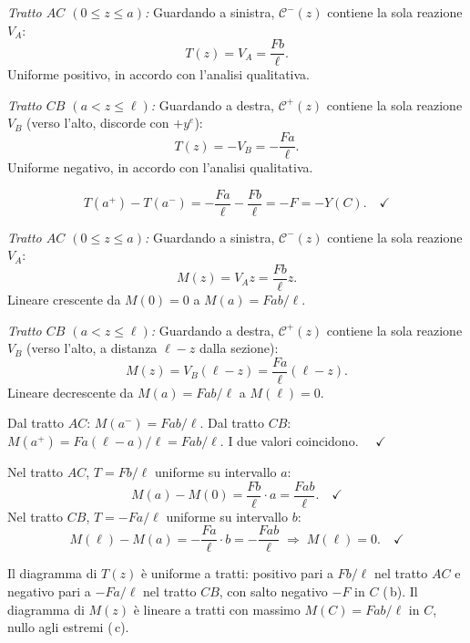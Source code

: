 \begin{esempio}
\begin{svolgimento}
		
		\textit{Tratto $AC$ $(0 \leq z \leq a)$:}
		Guardando a sinistra, $\mathcal{C}^-(z)$
		contiene la sola reazione $V_A$:
		\[
		T(z) = V_A = \frac{Fb}{\ell}.
		\]
		Uniforme positivo, in accordo con l'analisi
		qualitativa.
		
		\textit{Tratto $CB$ $(a < z \leq \ell)$:}
		Guardando a destra, $\mathcal{C}^+(z)$
		contiene la sola reazione $V_B$ (verso l'alto,
		discorde con $+y^e$):
		\[
		T(z) = -V_B = -\frac{Fa}{\ell}.
		\]
		Uniforme negativo, in accordo con l'analisi
		qualitativa.
		
		\[
		T(a^+) - T(a^-)
		= -\frac{Fa}{\ell} - \frac{Fb}{\ell}
		= -F = -Y(C). \quad\checkmark
		\]
		
		
		\textit{Tratto $AC$ $(0 \leq z \leq a)$:}
		Guardando a sinistra, $\mathcal{C}^-(z)$
		contiene la sola reazione $V_A$:
		\[
		M(z) = V_A z = \frac{Fb}{\ell}z.
		\]
		Lineare crescente da $M(0) = 0$ a
		$M(a) = Fab/\ell$.
		
		\textit{Tratto $CB$ $(a < z \leq \ell)$:}
		Guardando a destra, $\mathcal{C}^+(z)$
		contiene la sola reazione $V_B$ (verso l'alto,
		a distanza $\ell - z$ dalla sezione):
		\[
		M(z) = V_B(\ell - z) = \frac{Fa}{\ell}(\ell - z).
		\]
		Lineare decrescente da $M(a) = Fab/\ell$
		a $M(\ell) = 0$.
		
		Dal tratto $AC$: $M(a^-) = Fab/\ell$.
		Dal tratto $CB$: $M(a^+) = Fa(\ell-a)/\ell
		= Fab/\ell$.
		I due valori coincidono. $\quad\checkmark$
		
		Nel tratto $AC$, $T = Fb/\ell$ uniforme su
		intervallo $a$:
		\[
		M(a) - M(0) = \frac{Fb}{\ell}\cdot a
		= \frac{Fab}{\ell}. \quad\checkmark
		\]
		Nel tratto $CB$, $T = -Fa/\ell$ uniforme su
		intervallo $b$:
		\[
		M(\ell) - M(a) = -\frac{Fa}{\ell}\cdot b
		= -\frac{Fab}{\ell}
		\;\Rightarrow\; M(\ell) = 0. \quad\checkmark
		\]
		
		\noindent
		Il diagramma di $T(z)$ è uniforme a tratti:
		positivo pari a $Fb/\ell$ nel tratto $AC$ e
		negativo pari a $-Fa/\ell$ nel tratto $CB$,
		con salto negativo $-F$ in $C$ (\,b).
		Il diagramma di $M(z)$ è lineare a tratti
		con massimo $M(C) = Fab/\ell$ in $C$,
		nullo agli estremi  (\,c).
		
	\end{svolgimento}
\end{esempio}

